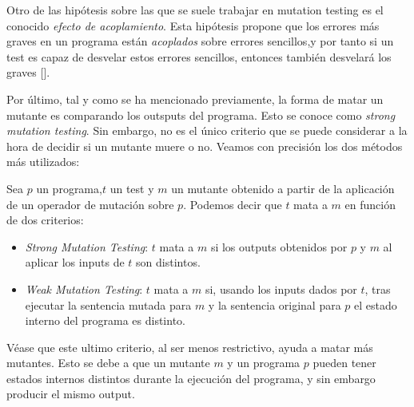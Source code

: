 Otro de las hipótesis sobre las que se suele trabajar en mutation testing es el conocido \textit{efecto de acoplamiento}. Esta hipótesis propone que los errores más graves en un programa están \textit{acoplados} sobre errores sencillos,y por tanto si un test es capaz de desvelar estos errores sencillos, entonces también desvelará los graves [\cite{offutt1992investigations}].

Por último, tal y como se ha mencionado previamente, la forma de matar un mutante es comparando los outsputs del programa. Esto se conoce como \textit{strong mutation testing}. Sin embargo, no es el único criterio que se puede considerar a la hora de decidir si un mutante muere o no. Veamos con precisión los dos métodos más utilizados:

\begin{definition}
\label{def:def24}
Sea $p$ un programa,$t$ un test y $m$ un mutante obtenido a partir de la aplicación de un operador de mutación sobre $p$. Podemos decir que $t$ mata a $m$ en función de dos criterios:
\begin{itemize}
\item \emph{Strong Mutation Testing}: $t$ mata a $m$ si los outputs obtenidos por $p$ y $m$ al aplicar los inputs de $t$ son distintos.
\item \emph{Weak Mutation Testing}: $t$ mata a $m$ si, usando los inputs dados por $t$,  tras ejecutar la sentencia mutada para $m$ y la sentencia original para $p$ el estado interno del programa es distinto. 
\end{itemize}
\end{definition}

Véase que este ultimo criterio, al ser menos restrictivo, ayuda a matar más mutantes. Esto se debe a que un mutante $m$ y un programa $p$ pueden tener estados internos distintos durante la ejecución del programa, y sin embargo producir el mismo output. 

